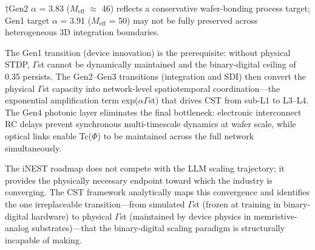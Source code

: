 \documentclass[a4paper,12pt]{article}
\begin{document}
†Gen2 $\alpha$ = 3.83 ($M_{\text{eff}}$ $\approx$ 46) reflects a conservative wafer-bonding process target; Gen1 target $\alpha$ = 3.91 ($M_{\text{eff}}$ = 50) may not be fully preserved across heterogeneous 3D integration boundaries.


The Gen1 transition (device innovation) is the prerequisite: without physical STDP, $\Gamma$st cannot be dynamically maintained and the binary-digital ceiling of 0.35 persists. The Gen2--Gen3 transitions (integration and SDI) then convert the physical $\Gamma$st capacity into network-level spatiotemporal coordination---the exponential amplification term exp($\alpha$\cdot$\Gamma$st) that drives CST from sub-L1 to L3--L4. The Gen4 photonic layer eliminates the final bottleneck: electronic interconnect RC delays prevent synchronous multi-timescale dynamics at wafer scale, while optical links enable Tc($\Phi$) to be maintained across the full network simultaneously.


The iNEST roadmap does not compete with the LLM scaling trajectory; it provides the physically necessary endpoint toward which the industry is converging. The CST framework analytically maps this convergence and identifies the one irreplaceable transition---from simulated $\Gamma$st (frozen at training in binary-digital hardware) to physical $\Gamma$st (maintained by device physics in memristive-analog substrates)---that the binary-digital scaling paradigm is structurally incapable of making.
\end{document}
